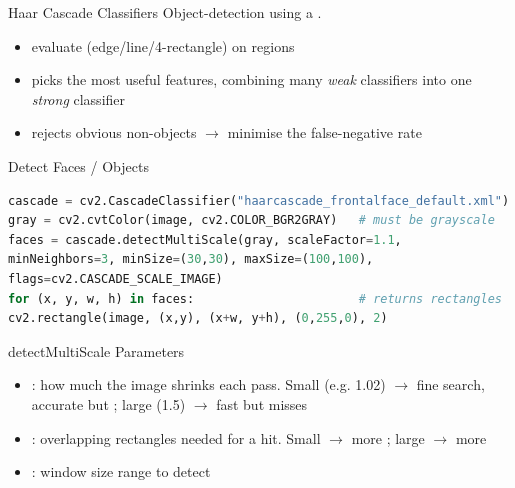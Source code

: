 
\begin{concept}{Haar Cascade Classifiers}
    Object-detection using a .
    \begin{itemize}
        \item evaluate  (edge/line/4-rectangle) on regions
        \item {} picks the most useful features, combining many
              \emph{weak} classifiers into one \emph{strong} classifier
        \item {} rejects obvious non-objects 
              $\to$ minimise the false-negative rate
    \end{itemize}
\end{concept}

\begin{KR}{Detect Faces / Objects}
\begin{lstlisting}[language=Python, style=basesmol, aboveskip=2pt, belowskip=2pt]
cascade = cv2.CascadeClassifier("haarcascade_frontalface_default.xml")
gray = cv2.cvtColor(image, cv2.COLOR_BGR2GRAY)   # must be grayscale
faces = cascade.detectMultiScale(gray, scaleFactor=1.1,
minNeighbors=3, minSize=(30,30), maxSize=(100,100),
flags=cv2.CASCADE_SCALE_IMAGE)
for (x, y, w, h) in faces:                       # returns rectangles
cv2.rectangle(image, (x,y), (x+w, y+h), (0,255,0), 2)
\end{lstlisting}
\end{KR}

\begin{definition}{detectMultiScale Parameters}
    \begin{itemize}
        \item {}: how much the image shrinks each pass.
              Small (e.g. 1.02) $\to$ fine search, accurate but ;
              large (1.5) $\to$ fast but misses
        \item {}: overlapping rectangles needed for a hit.
              Small $\to$ more ; large $\to$ more 
        \item {}: window size range to detect
    \end{itemize}
\end{definition}

